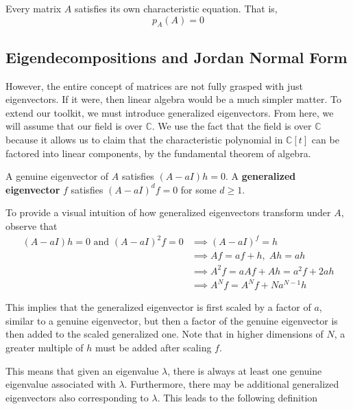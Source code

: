   \begin{theorem}
    Every matrix $A$ satisfies its own characteristic equation. That is, 
    \[ p_{A}(A) = 0\]
  \end{theorem} 

\subsection{Eigendecompositions and Jordan Normal Form}

  However, the entire concept of matrices are not fully grasped with just eigenvectors. If it were, then linear algebra would be a much simpler matter. To extend our toolkit, we must introduce generalized eigenvectors. From here, we will assume that our field is over $\mathbb{C}$. We use the fact that the field is over $\mathbb{C}$ because it allows us to claim that the characteristic polynomial in $\mathbb{C}[t]$ can be factored into linear components, by the fundamental theorem of algebra. 

  \begin{definition}
    A genuine eigenvector of $A$ satisfies $(A-aI)h = 0$. A \textbf{generalized eigenvector} $f$ satisfies $(A-a I)^{d} f = 0$ for some $d \geq 1$. 
  \end{definition}

  To provide a visual intuition of how generalized eigenvectors transform under $A$, observe that 
  \begin{align}
    (A - aI) h = 0 \text{ and } (A - aI)^2 f = 0 & \implies (A - aI)^f = h \\
    & \implies A f = a f + h, \; Ah = ah \\
    & \implies A^2 f = a A f + A h = a^2 f + 2 a h \\
    & \implies A^N f = A^N f + N a^{N-1} h 
  \end{align}

  This implies that the generalized eigenvector is first scaled by a factor of $a$, similar to a genuine eigenvector, but then a factor of the genuine eigenvector is then added to the scaled generalized one. Note that in higher dimensions of $N$, a greater multiple of $h$ must be added after scaling $f$. 

  This means that given an eigenvalue $\lambda$, there is always at least one genuine eigenvalue associated with $\lambda$. Furthermore, there may be additional generalized eigenvectors also corresponding to $\lambda$. This leads to the following definition

